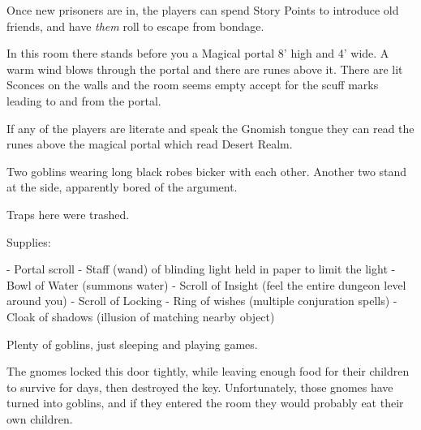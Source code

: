 \begin{multicols}{2}
Once new prisoners are in, the players can spend Story Points to introduce old friends, and have \textit{them} roll to escape from bondage.


\begin{boxtext}

	In this room there stands before you a Magical portal 8' high and 4' wide.
	A warm wind blows through the portal and there are runes above it.
	There are lit Sconces on the walls and the room seems empty accept for the scuff marks leading to and from the portal. 

\end{boxtext}

If any of the players are literate and speak the Gnomish tongue they can read the runes above the magical portal which read Desert Realm.


\begin{boxtext}

	Two goblins wearing long black robes bicker with each other.
	Another two stand at the side, apparently bored of the argument.

\end{boxtext}




Traps here were trashed.

Supplies:

- Portal scroll
- Staff (wand) of blinding light held in paper to limit the light
- Bowl of Water (summons water)
- Scroll of Insight (feel the entire dungeon level around you)
- Scroll of Locking
- Ring of wishes (multiple conjuration spells)
- Cloak of shadows (illusion of matching nearby object)

\goblinnuramancer

\goblin


Plenty of goblins, just sleeping and playing games.

\goblin


\begin{exampletext}

	The gnomes locked this door tightly, while leaving enough food for their children to survive for days, then destroyed the key.
	Unfortunately, those gnomes have turned into goblins, and if they entered the room they would probably eat their own children.


\end{exampletext}
\end{multicols}
